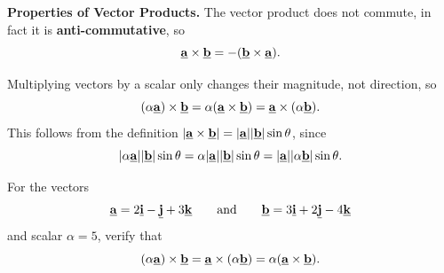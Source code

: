 \textbf{Properties of Vector Products.} The vector product does not commute, in fact it is \textbf{anti-commutative}, so
\begin{equation}
    \underline{\mathbf{a}}\times\underline{\mathbf{b}}=-(\underline{\mathbf{b}}\times\underline{\mathbf{a}}).    
\end{equation}

Multiplying vectors by a scalar only changes their magnitude, not direction, so 
\begin{equation}
    (\alpha\underline{\mathbf{a}})\times\underline{\mathbf{b}}
=\alpha(\underline{\mathbf{a}}\times\underline{\mathbf{b}})
=\underline{\mathbf{a}}\times(\alpha\underline{\mathbf{b}}).
\end{equation}
This follows from the definition $\left\lvert\underline{\mathbf{a}}\times\underline{\mathbf{b}}\right\rvert
=\lvert\underline{\mathbf{a}}\rvert\lvert\underline{\mathbf{b}}\rvert\sin\theta$, since
\[
\lvert\alpha\underline{\mathbf{a}}\rvert\lvert\underline{\mathbf{b}}\rvert\sin\theta
=\alpha\lvert\underline{\mathbf{a}}\rvert\lvert\underline{\mathbf{b}}\rvert\sin\theta
=\lvert\underline{\mathbf{a}}\rvert\lvert\alpha\underline{\mathbf{b}}\rvert\sin\theta. 
\]

\begin{example}[Video]
For the vectors
\[
\underline{\mathbf{a}}=2\underline{\mathbf{i}}-\underline{\mathbf{j}}+3\underline{\mathbf{k}}
\qquad\text{and}\qquad
\underline{\mathbf{b}}=3\underline{\mathbf{i}}+2\underline{\mathbf{j}}-4\underline{\mathbf{k}}
\]
and scalar $\alpha=5$, verify that
\[
(\alpha\underline{\mathbf{a}})\times\underline{\mathbf{b}}
=\underline{\mathbf{a}}\times(\alpha\underline{\mathbf{b}})
=\alpha(\underline{\mathbf{a}}\times\underline{\mathbf{b}}).
\]
\end{example}

